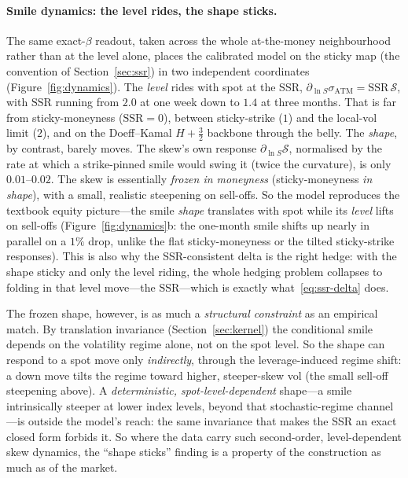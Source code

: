 \documentclass[11pt]{article}
\newcommand{\SSR}{\mathrm{SSR}}
\begin{document}
\paragraph{Smile dynamics: the level rides, the shape sticks.}
The same exact-$\beta$ readout, taken across the whole at-the-money neighbourhood rather than at the level
alone, places the calibrated model on the sticky map (the convention of Section~\ref{sec:ssr}) in two
independent coordinates (Figure~\ref{fig:dynamics}). The \emph{level} rides with spot at the SSR,
$\partial_{\ln S}\sigma_{\mathrm{ATM}}=\SSR\,\mathcal S$, with $\SSR$ running from $2.0$ at one
week down to $1.4$ at three months. That is far from sticky-moneyness ($\SSR{=}0$), between
sticky-strike ($1$) and the local-vol limit ($2$), and on the Doeff--Kamal $H{+}\tfrac32$ backbone
through the belly. The \emph{shape}, by contrast, barely moves. The skew's own response
$\partial_{\ln S}\mathcal S$, normalised by the rate at which a strike-pinned smile would swing it
(twice the curvature), is only $0.01$--$0.02$. The skew is essentially \emph{frozen in moneyness}
(sticky-moneyness \emph{in shape}), with a small, realistic steepening on sell-offs.
So the model reproduces the textbook equity picture---the smile \emph{shape} translates with spot while its
\emph{level} lifts on sell-offs (Figure~\ref{fig:dynamics}b: the one-month smile shifts up nearly in parallel on
a $1\%$ drop, unlike the flat sticky-moneyness or the tilted sticky-strike responses). This is also why the
SSR-consistent delta is the right hedge: with the shape sticky and only the level riding, the whole hedging
problem collapses to folding in that level move---the $\SSR$---which is exactly what~\eqref{eq:ssr-delta} does.

The frozen shape, however, is as much a \emph{structural constraint} as an empirical match. By translation invariance (Section~\ref{sec:kernel}) the conditional smile depends on the
volatility regime alone, not on the spot level. So the shape can respond to a spot move only
\emph{indirectly}, through the leverage-induced regime shift: a down move tilts the regime toward
higher, steeper-skew vol (the small sell-off steepening above). A \emph{deterministic, spot-level-dependent} shape---a smile intrinsically
steeper at lower index levels, beyond that stochastic-regime channel---is outside the model's reach: the same
invariance that makes the SSR an exact closed form forbids it. So where the data carry such second-order,
level-dependent skew dynamics, the ``shape sticks'' finding is a property of the construction as much as of
the market.
\end{document}
